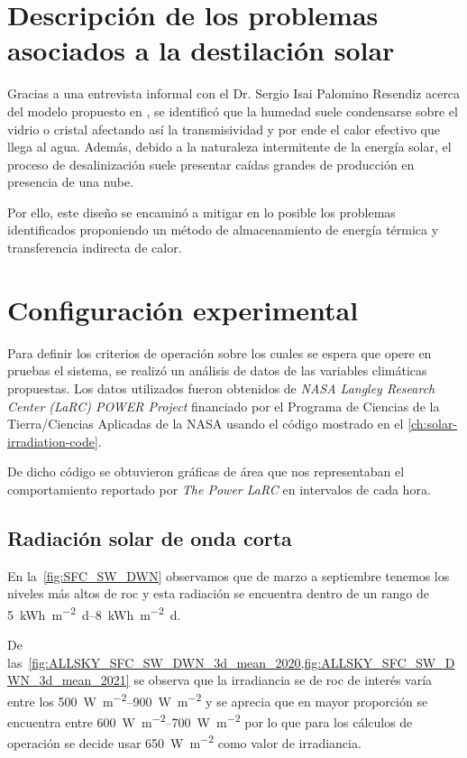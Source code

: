 	\section{Descripción de los problemas asociados a la destilación solar}
		
		Gracias a una entrevista informal con el Dr. Sergio Isai Palomino Resendiz acerca del modelo propuesto en \cite{palomino-resendiz_design_2018}, se identificó que la humedad suele condensarse sobre el vidrio o cristal afectando así la transmisividad y por ende el calor efectivo que llega al agua. Además, debido a la naturaleza intermitente de la energía solar, el proceso de desalinización suele presentar caídas grandes de producción en presencia de una nube.
		
		Por ello, este diseño se encaminó a mitigar en lo posible los problemas identificados proponiendo un método de almacenamiento de energía térmica y transferencia indirecta de calor.
		
	\section{Configuración experimental}
		
		Para definir los criterios de operación sobre los cuales se espera que opere en pruebas el sistema, se realizó un análisis de datos de las variables climáticas propuestas. Los datos utilizados fueron obtenidos de \textit{NASA Langley Research Center (LaRC) POWER Project} financiado por el Programa de Ciencias de la Tierra/Ciencias Aplicadas de la NASA usando el código mostrado en el \cref{ch:solar-irradiation-code}.
		
		De dicho código se obtuvieron gráficas de área que nos representaban el comportamiento reportado por \textit{The Power LaRC} en intervalos de cada hora.
	
		\subsection{Radiación solar de onda corta}
			
			En la~\cref{fig:SFC_SW_DWN} observamos que de marzo a septiembre tenemos los niveles más altos de \acrlong{roc} y esta radiación se encuentra dentro de un rango de \qtyrange{5}{8}{\kWh\per\m\tothe{2}\day}.
			
			De las~\cref{fig:ALLSKY_SFC_SW_DWN_3d_mean_2020,fig:ALLSKY_SFC_SW_DWN_3d_mean_2021} se observa que la irradiancia se de \acrshort{roc} de interés varía entre los \qtyrange{500}{900}{\watt\per\m\tothe{2}} y se aprecia que en mayor proporción se encuentra entre \qtyrange{600}{700}{\watt\per\m\tothe{2}} por lo que para los cálculos de operación se decide usar \qty{650}{\watt\per\m\tothe{2}} como valor de irradiancia.
	
